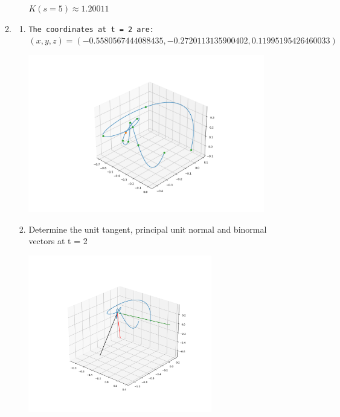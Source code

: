 \documentclass[a4paper,11pt]{article}
\begin{document}
\begin{preview}
\begin{enumerate}
\begin{enumerate}
\begin{enumerate}
    $K(s=5) \approx 1.20011 $\\
    

\end{enumerate}

\item 
\begin{enumerate}
    \item \texttt{The coordinates at t = 2 are: \\$(x,y,z) = (-0.5580567444088435,-0.2720113135900402,0.11995195426460033)$}
    \begin{center}
        \hspace{-50pt}
        \includegraphics[width = 0.9\textwidth]{Figure_2.png}
    \end{center}

    \item Determine the unit tangent, principal unit normal and binormal vectors at t = 2
    \begin{center}
        \hspace{-50pt}
        \includegraphics[width = 0.7\textwidth]{Figure_3.png}
    \end{center}
\end{enumerate}


\end{enumerate}
\end{enumerate}
\end{preview}
\end{document}
